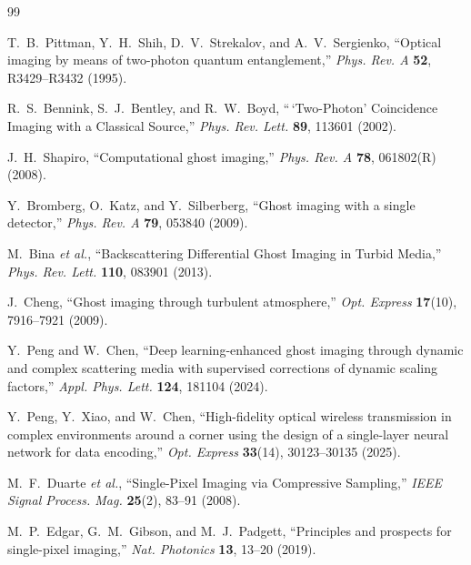 
\begin{thebibliography}{99}

T.~B.~Pittman, Y.~H.~Shih, D.~V.~Strekalov, and A.~V.~Sergienko, ``Optical imaging by means of two-photon quantum entanglement,'' \emph{Phys. Rev. A} \textbf{52}, R3429--R3432 (1995).

R.~S.~Bennink, S.~J.~Bentley, and R.~W.~Boyd, ``\,`Two-Photon' Coincidence Imaging with a Classical Source,'' \emph{Phys. Rev. Lett.} \textbf{89}, 113601 (2002).

J.~H.~Shapiro, ``Computational ghost imaging,'' \emph{Phys. Rev. A} \textbf{78}, 061802(R) (2008).

Y.~Bromberg, O.~Katz, and Y.~Silberberg, ``Ghost imaging with a single detector,'' \emph{Phys. Rev. A} \textbf{79}, 053840 (2009).

M.~Bina \emph{et al.}, ``Backscattering Differential Ghost Imaging in Turbid Media,'' \emph{Phys. Rev. Lett.} \textbf{110}, 083901 (2013).

J.~Cheng, ``Ghost imaging through turbulent atmosphere,'' \emph{Opt. Express} \textbf{17}(10), 7916--7921 (2009).

Y.~Peng and W.~Chen, ``Deep learning-enhanced ghost imaging through dynamic and complex scattering media with supervised corrections of dynamic scaling factors,'' \emph{Appl. Phys. Lett.} \textbf{124}, 181104 (2024).

Y.~Peng, Y.~Xiao, and W.~Chen, ``High-fidelity optical wireless transmission in complex environments around a corner using the design of a single-layer neural network for data encoding,'' \emph{Opt. Express} \textbf{33}(14), 30123--30135 (2025).

M.~F.~Duarte \emph{et al.}, ``Single-Pixel Imaging via Compressive Sampling,'' \emph{IEEE Signal Process. Mag.} \textbf{25}(2), 83--91 (2008).

M.~P.~Edgar, G.~M.~Gibson, and M.~J.~Padgett, ``Principles and prospects for single-pixel imaging,'' \emph{Nat. Photonics} \textbf{13}, 13--20 (2019).


\end{thebibliography}
